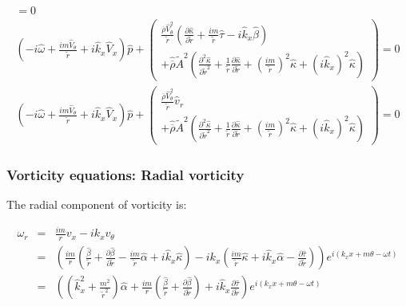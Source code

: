 \begin{eqnarray}
 = 
0
\nonumber
\\
\left(
-i \widehat{\omega}
+ \frac{i m \widehat{V}_{\theta}}{\widetilde{r}}
+i \widehat{k}_x \widehat{V}_x 
\right) 
\widehat{p} 
+
\left(
\begin{array}{r}
\frac{\overline{\rho} \widehat{V}_{\theta}^2}{\widetilde{r}}
\left(
\frac{\partial \widehat{\kappa}}{\partial \widetilde{r}}
+
\frac{i m}{\widetilde{r}}
\widehat{\tau}
-
i \widehat{k}_x \widehat{\beta}
\right) 
\\
+ 
\widehat{\overline{\rho}} \widetilde{A}^2
\left(
\frac{\partial^2 \widehat{\kappa}}{\partial \widetilde{r}^2}
+ 
\frac{1}{\widetilde{r}} 
\frac{\partial \widehat{\kappa}}{\partial \widetilde{r}}
+
\left(\frac{i m}{\widetilde{r}} \right)^2 \widehat{\kappa}
+ 
\left(i \widehat{k}_x \right)^2 \widehat{\kappa}
\right)
\end{array}
\right)
 = 
0
\nonumber
\\
\left(
-i \widehat{\omega}
+ \frac{i m \widehat{V}_{\theta}}{\widetilde{r}}
+i \widehat{k}_x \widehat{V}_x 
\right) 
\widehat{p} 
+
\left(
\begin{array}{r}
\frac{\overline{\rho} \widehat{V}_{\theta}^2}{\widetilde{r}}
\widehat{v}_r
\\
+ 
\widehat{\overline{\rho}} \widetilde{A}^2
\left(
\frac{\partial^2 \widehat{\kappa}}{\partial \widetilde{r}^2}
+ 
\frac{1}{\widetilde{r}} 
\frac{\partial \widehat{\kappa}}{\partial \widetilde{r}}
+
\left(\frac{i m}{\widetilde{r}} \right)^2 \widehat{\kappa}
+ 
\left(i \widehat{k}_x \right)^2 \widehat{\kappa}
\right)
\end{array}
\right)
 = 
0
\nonumber
\end{eqnarray}

\subsubsection{Vorticity equations: Radial vorticity}

The radial component of vorticity is:

\begin{eqnarray}
\omega_r &=&
\frac{im}{r} 
v_x 
- 
i k_x 
v_{\theta}
\nonumber
\\
&=&
\left(
\frac{im}{r} 
\left(
\frac{\widehat{\beta}}{\widetilde{r}}
+\frac{\partial \widehat{\beta}}{\partial \widetilde{r}}
-
\frac{i m}{\widetilde{r}}
\widehat{\alpha}
+ i \widehat{k}_x \widehat{\kappa}
\right) 
-
i k_x 
\left(
\frac{i m}{\widetilde{r}} \widehat{\kappa}
+
i \widehat{k}_x \widehat{\alpha}
-
\frac{\partial \widehat{\tau}}{\partial \widetilde{r}}
\right) 
\right)
e^{i \left(k_x x + m \theta - \omega t \right)} 
\nonumber
\\
&=&
\left(
\left(\widehat{k}_x^2 + \frac{m^2}{\widetilde{r}^2} \right) \widehat{\alpha}
+
\frac{im}{r} 
\left(
\frac{\widehat{\beta}}{\widetilde{r}}
+\frac{\partial \widehat{\beta}}{\partial \widetilde{r}}
\right)
+i \widehat{k}_x 
\frac{\partial \widehat{\tau}}{\partial \widetilde{r}}
\right)
e^{i \left(k_x x + m \theta - \omega t \right)} 
\nonumber
\end{eqnarray}

